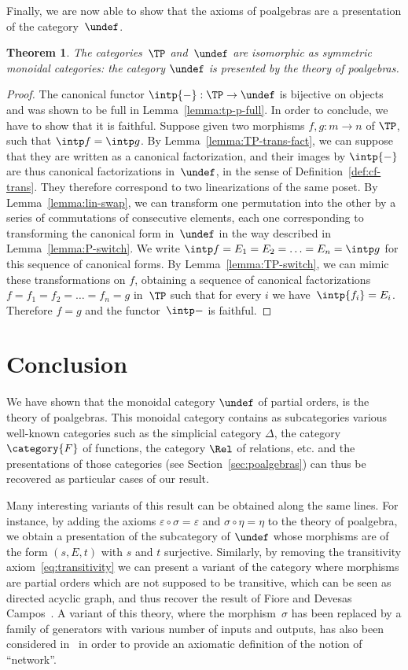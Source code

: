 \documentclass[submission,copyright,creativecommons]{eptcs}
\let\P\undef
\newtheorem{theorem}{Theorem}
\theoremstyle{definition}
\theoremstyle{remark}
\begin{document}
\noindent
Finally, we are now able to show that the axioms of poalgebras are a
presentation of the category~$\P$.

\begin{theorem}
  \label{thm:p-qtbbe}
  The categories~$\TP$ and~$\P$ are isomorphic as symmetric monoidal categories:
  the category $\P$ is presented by the theory of poalgebras.
\end{theorem}
\begin{proof}
  The canonical functor $\intp{-}:\TP\to\P$ is bijective on objects and was
  shown to be full in Lemma~\ref{lemma:tp-p-full}. In order to conclude, we have
  to show that it is faithful. Suppose given two morphisms $f,g:m\to n$ of
  $\TP$, such that $\intp f=\intp g$. By Lemma~\ref{lemma:TP-trans-fact}, we can
  suppose that they are written as a canonical factorization, and their images
  by $\intp{-}$ are thus canonical factorizations in~$\P$, in the sense of
  Definition~\ref{def:cf-trans}. They therefore correspond to two linearizations
  of the same poset. By Lemma~\ref{lemma:lin-swap}, we can transform one
  permutation into the other by a series of commutations of consecutive
  elements, each one corresponding to transforming the canonical form in~$\P$ in
  the way described in Lemma~\ref{lemma:P-switch}. We write $\intp
  f=E_1=E_2=\ldots=E_n=\intp g$ for this sequence of canonical forms. By
  Lemma~\ref{lemma:TP-switch}, we can mimic these transformations on $f$,
  obtaining a sequence of canonical factorizations $f=f_1=f_2=\ldots=f_n=g$
  in~$\TP$ such that for every $i$ we have~$\intp{f_i}=E_i$. Therefore $f=g$ and
  the functor~$\intp-$ is faithful.
\end{proof}

\section{Conclusion}
\label{sec:concl}
We have shown that the monoidal category $\P$ of partial orders, is the theory
of poalgebras. This monoidal category contains as subcategories various
well-known categories such as the simplicial category $\Delta$, the category
$\category{F}$ of functions, the category $\Rel$ of relations, etc. and the
presentations of those categories (see Section~\ref{sec:poalgebras}) can thus be
recovered as particular cases of our result.

Many interesting variants of this result can be obtained along the same
lines. For instance, by adding the axioms $\varepsilon\circ\sigma=\varepsilon$
and $\sigma\circ\eta=\eta$ to the theory of poalgebra, we obtain a presentation
of the subcategory of $\P$ whose morphisms are of the form $(s,E,t)$ with $s$
and $t$ surjective. Similarly, by removing the transitivity
axiom~\eqref{eq:transitivity} we can present a variant of the category where
morphisms are partial orders which are not supposed to be transitive, which can
be seen as directed acyclic graph, and thus recover the result of Fiore and
Devesas Campos~\cite{fiore2013algebra}. A variant of this theory, where the
morphism~$\sigma$ has been replaced by a family of generators with various
number of inputs and outputs, has also been considered in~\cite{beauxis2011non}
in order to provide an axiomatic definition of the notion of ``network''.
\end{document}
